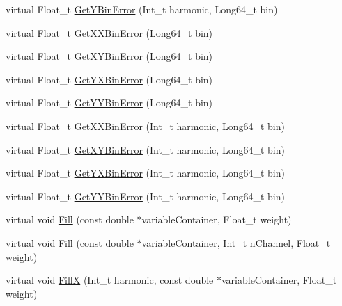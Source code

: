 \begin{DoxyCompactItemize}
\item 
virtual Float\+\_\+t \mbox{\hyperlink{classQn_1_1CorrectionHistogramBase_ad9b6bbde5fc1d8b5c282d33bd1bc50b4}{Get\+Y\+Bin\+Error}} (Int\+\_\+t harmonic, Long64\+\_\+t bin)
\item 
virtual Float\+\_\+t \mbox{\hyperlink{classQn_1_1CorrectionHistogramBase_ae7b4e0bfb45e52cc7050eefc78c5230e}{Get\+X\+X\+Bin\+Error}} (Long64\+\_\+t bin)
\item 
virtual Float\+\_\+t \mbox{\hyperlink{classQn_1_1CorrectionHistogramBase_ae7dada656dda33ba9adca7bcbd78f4d2}{Get\+X\+Y\+Bin\+Error}} (Long64\+\_\+t bin)
\item 
virtual Float\+\_\+t \mbox{\hyperlink{classQn_1_1CorrectionHistogramBase_a07055fbf2b7df0ee3912fd68c18572c0}{Get\+Y\+X\+Bin\+Error}} (Long64\+\_\+t bin)
\item 
virtual Float\+\_\+t \mbox{\hyperlink{classQn_1_1CorrectionHistogramBase_aec361c84c8291093f17ae6839384eeb9}{Get\+Y\+Y\+Bin\+Error}} (Long64\+\_\+t bin)
\item 
virtual Float\+\_\+t \mbox{\hyperlink{classQn_1_1CorrectionHistogramBase_a6c0874928f737e86a7f72cba9a9922b7}{Get\+X\+X\+Bin\+Error}} (Int\+\_\+t harmonic, Long64\+\_\+t bin)
\item 
virtual Float\+\_\+t \mbox{\hyperlink{classQn_1_1CorrectionHistogramBase_afcd23dbf89783fd907ccbe90ca4a776b}{Get\+X\+Y\+Bin\+Error}} (Int\+\_\+t harmonic, Long64\+\_\+t bin)
\item 
virtual Float\+\_\+t \mbox{\hyperlink{classQn_1_1CorrectionHistogramBase_a2dc192026e8bb323cb7a93c5d36584bf}{Get\+Y\+X\+Bin\+Error}} (Int\+\_\+t harmonic, Long64\+\_\+t bin)
\item 
virtual Float\+\_\+t \mbox{\hyperlink{classQn_1_1CorrectionHistogramBase_a3ea1dbffee549c8cedb8926c34e46c77}{Get\+Y\+Y\+Bin\+Error}} (Int\+\_\+t harmonic, Long64\+\_\+t bin)
\item 
virtual void \mbox{\hyperlink{classQn_1_1CorrectionHistogramBase_a16b7518942714780ec9ceb56bb517f0f}{Fill}} (const double $\ast$variable\+Container, Float\+\_\+t weight)
\item 
virtual void \mbox{\hyperlink{classQn_1_1CorrectionHistogramBase_ae94b20c7d396f5b179fb11d84d764c09}{Fill}} (const double $\ast$variable\+Container, Int\+\_\+t n\+Channel, Float\+\_\+t weight)
\item 
virtual void \mbox{\hyperlink{classQn_1_1CorrectionHistogramBase_ae3f3b2905272cad4b0803840e9e3dab1}{FillX}} (Int\+\_\+t harmonic, const double $\ast$variable\+Container, Float\+\_\+t weight)
\item 

\end{DoxyCompactItemize}
